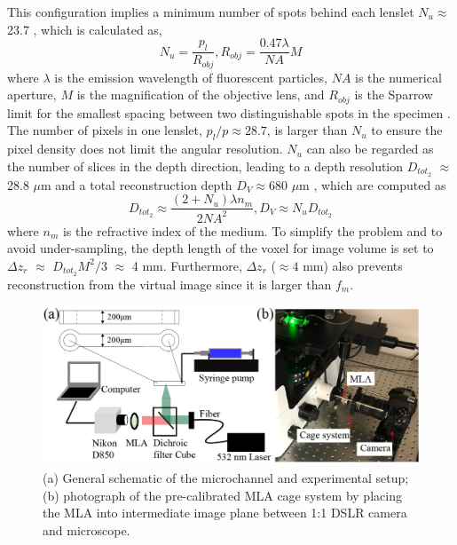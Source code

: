 \documentclass[draftthesis,fullpage]{uiucthesis}
\begin{document}
This configuration implies a minimum number of spots behind each lenslet $N_u\approx$ 23.7 \citep{levoy2006light}, which is calculated as,
\begin{equation}
  N_u = \frac{p_l}{R_{obj}}, R_{obj} = \frac{0.47\lambda}{NA}M
\label{eq:Nu}
\end{equation}
where $\lambda$ is the emission wavelength of fluorescent particles, $NA$ is the numerical aperture, $M$ is the magnification of the objective lens, and $R_{obj}$ is the Sparrow limit for the smallest spacing between two distinguishable spots in the specimen \citep{inoue2013video}. The number of pixels in one lenslet,  $p_l/p\approx 28.7$, is larger than $N_u$ to ensure the pixel density does not limit the angular resolution. $N_u$ can also be regarded as the number of slices in the depth direction, leading to a depth resolution $D_{tot_2}$ $\approx$ 28.8 $\mu$m and a total reconstruction depth $D_V\approx 680$ $\mu$m \citep{levoy2006light}, which are computed as
\begin{equation}
  D_{tot_2} \approx \frac{(2 + N_u)\lambda n_m}{2NA^2}, D_V \approx N_uD_{tot_2}
\label{eq:DtotAndDV}
\end{equation}
where $n_m$ is the refractive index of the medium. 
To simplify the problem and to avoid under-sampling, the depth length of the voxel for image volume is set to $\Delta z_r$ $\approx$ $D_{tot_2}M^2/3$ $\approx$ 4 mm. Furthermore, $\Delta z_r$ ($\approx 4$ mm) also prevents reconstruction from the virtual image since it is larger than $f_m$. 
\begin{figure}[h]
       \centerline{\includegraphics[width=0.8\linewidth]{fig/figure6.jpg}}
       \caption{(a) General schematic of the microchannel and experimental setup; (b) photograph of the pre-calibrated MLA cage system by placing the MLA into intermediate image plane between 1:1 DSLR camera and microscope.}
       \label{fig:setup}
\end{figure}
\end{document}
